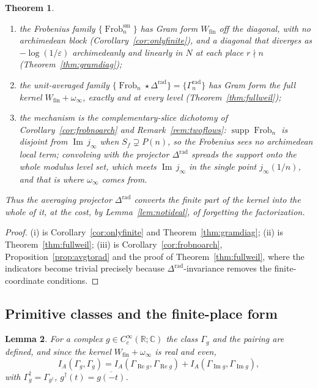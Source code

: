 \documentclass[11pt]{amsart}
\newtheorem{theorem}{Theorem}[section]
\newtheorem{lemma}[theorem]{Lemma}
\theoremstyle{definition}
\theoremstyle{remark}
\newcommand{\C}{\mathbb C}
\newcommand{\R}{\mathbb R}
\newcommand{\Rel}{\operatorname{Re}}
\newcommand{\Iml}{\operatorname{Im}}
\newcommand{\Frob}{\operatorname{Frob}}
\newcommand{\supp}{\operatorname{supp}}
\newcommand{\Wfin}{W_{\mathrm{fin}}}
\begin{document}
\begin{theorem}\label{thm:twohalves}
\begin{enumerate}
\item[(i)] the Frobenius family $\{\Frob_n^{\mathrm{sm}}\}$ has Gram form
$\Wfin$ off the diagonal, with no archimedean block
(Corollary~\ref{cor:onlyfinite}), and a diagonal that diverges as
$-\log(1/\varepsilon)$ archimedeanly and linearly in $N$ at each place
$r\nmid n$ (Theorem~\ref{thm:gramdiag});
\item[(ii)] the unit-averaged family
$\{\Frob_n\star\Delta^{\mathrm{rad}}\}=\{\Gamma_n^{\mathrm{rad}}\}$ has Gram
form the full kernel $\Wfin+\omega_\infty$, exactly and at every level
(Theorem~\ref{thm:fullweil});
\item[(iii)] the mechanism is the complementary-slice dichotomy of
Corollary~\ref{cor:frobnoarch} and Remark~\ref{rem:twoflows}: $\supp\Frob_n$ is
disjoint from $\Iml\,j_\infty$ when $S_f\supsetneq P(n)$, so the Frobenius sees
no archimedean local term; convolving with the projector
$\Delta^{\mathrm{rad}}$ spreads the support onto the whole modulus level set,
which meets $\Iml\,j_\infty$ in the single point $j_\infty(1/n)$, and that is
where $\omega_\infty$ comes from.
\end{enumerate}
Thus the averaging projector $\Delta^{\mathrm{rad}}$ converts the finite part
of the kernel into the whole of it, at the cost, by Lemma~\ref{lem:notideal},
of forgetting the factorization.
\end{theorem}

\begin{proof}
(i) is Corollary~\ref{cor:onlyfinite} and Theorem~\ref{thm:gramdiag}; (ii) is
Theorem~\ref{thm:fullweil}; (iii) is Corollary~\ref{cor:frobnoarch},
Proposition~\ref{prop:avgtorad} and the proof of
Theorem~\ref{thm:fullweil}, where the indicators become trivial precisely
because $\Delta^{\mathrm{rad}}$-invariance removes the finite-coordinate
conditions.
\end{proof}

\subsection{Primitive classes and the finite-place form}

\begin{lemma}\label{lem:complexprofiles}
For a complex $g\in C_c^\infty(\R;\C)$ the class $\Gamma_g$ and the pairing are
defined, and since the kernel $\Wfin+\omega_\infty$ is real and even,
\begin{equation}\label{eq:realimag}
  I_A(\Gamma_g,\Gamma_g)=I_A(\Gamma_{\Rel g},\Gamma_{\Rel g})
   +I_A(\Gamma_{\Iml g},\Gamma_{\Iml g}),
\end{equation}
with $\Gamma_g^\dagger=\Gamma_{g^\dagger}$,
$g^\dagger(t)=\overline{g(-t)}$.
\end{lemma}
\end{document}
